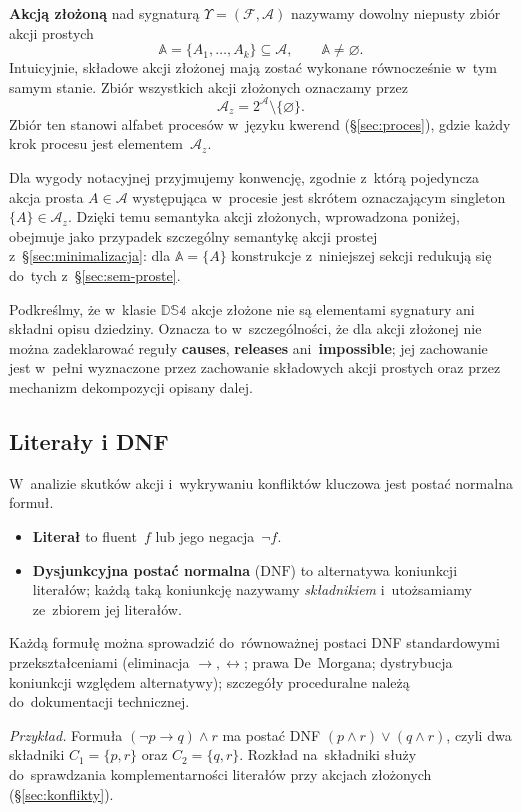 \documentclass[11pt,a4paper]{article}
\newcommand{\causes}{\textbf{causes}}
\newcommand{\impossible}{\textbf{impossible}}
\newcommand{\releases}{\textbf{releases}}
\theoremstyle{definition}
\begin{document}
\textbf{Akcją złożoną} nad sygnaturą $\Upsilon=(\mathcal{F},\mathcal{A})$
nazywamy dowolny niepusty zbiór akcji prostych
\[
  \mathbb{A} = \{A_1, \ldots, A_k\} \subseteq \mathcal{A},
  \qquad \mathbb{A} \neq \varnothing.
\]
Intuicyjnie, składowe akcji złożonej mają zostać wykonane równocześnie
w~tym samym stanie. Zbiór wszystkich akcji złożonych oznaczamy przez
\[
  \mathcal{A}_z = 2^{\mathcal{A}} \setminus \{\varnothing\}.
\]
Zbiór ten stanowi alfabet procesów w~języku kwerend (\S\ref{sec:proces}),
gdzie każdy krok procesu jest elementem~$\mathcal{A}_z$.

Dla wygody notacyjnej przyjmujemy konwencję, zgodnie z~którą pojedyncza
akcja prosta $A \in \mathcal{A}$ występująca w~procesie jest skrótem
oznaczającym singleton $\{A\} \in \mathcal{A}_z$. Dzięki temu semantyka
akcji złożonych, wprowadzona poniżej, obejmuje jako przypadek szczególny
semantykę akcji prostej z~\S\ref{sec:minimalizacja}: dla
$\mathbb{A} = \{A\}$ konstrukcje z~niniejszej sekcji redukują się do~tych
z~\S\ref{sec:sem-proste}.

Podkreślmy, że w~klasie $\mathbb{DS4}$ akcje złożone nie są elementami
sygnatury ani składni opisu dziedziny. Oznacza to w~szczególności, że
dla akcji złożonej nie można zadeklarować reguły \causes{}, \releases{}
ani~\impossible{}; jej zachowanie jest w~pełni wyznaczone przez
zachowanie składowych akcji prostych oraz przez mechanizm dekompozycji
opisany dalej.

\subsection{Literały i DNF}

W~analizie skutków akcji i~wykrywaniu konfliktów kluczowa jest postać normalna formuł.
\begin{itemize}
  \item \textbf{Literał} to fluent~$f$ lub jego negacja~$\neg f$.
  \item \textbf{Dysjunkcyjna postać normalna} ($\mathrm{DNF}$) to alternatywa koniunkcji literałów; każdą taką koniunkcję nazywamy \emph{składnikiem} i~utożsamiamy ze~zbiorem jej literałów.
\end{itemize}
Każdą formułę można sprowadzić do~równoważnej postaci DNF standardowymi przekształceniami (eliminacja $\to,\leftrightarrow$; prawa De~Morgana; dystrybucja koniunkcji względem alternatywy); szczegóły proceduralne należą do~dokumentacji technicznej.

\smallskip\noindent\emph{Przykład.}
Formuła $(\neg p \to q) \land r$ ma postać DNF $(p \land r) \lor (q \land r)$, czyli dwa składniki $C_1 = \{p, r\}$ oraz $C_2 = \{q, r\}$. Rozkład na~składniki służy do~sprawdzania komplementarności literałów przy akcjach złożonych (\S\ref{sec:konflikty}).
\end{document}
